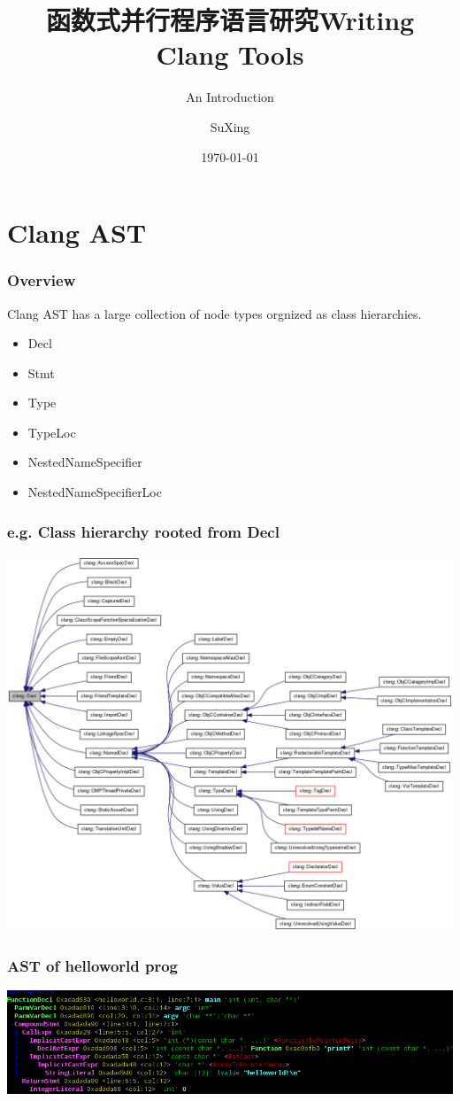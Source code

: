 \documentclass[]{beamer}
\title{函数式并行程序语言研究}
\title{Writing Clang Tools}
\subtitle{An Introduction}
\author[SuXing~pysuxing@gmail.com]{SuXing}
\institute{TOW}
\date{\today}
\begin{document}
\setlength{\parindent}{0pt}

\frame{\titlepage}

\frame{\tableofcontents}

\section{Clang AST}
\frame{\tableofcontents[currentsection]}
\begin{frame}
  \frametitle{Overview}
  Clang AST has a large collection of node types orgnized as class hierarchies.
  \begin{itemize}
    \item Decl
    \item Stmt
    \item Type
    \item TypeLoc
    \item NestedNameSpecifier
    \item NestedNameSpecifierLoc
  \end{itemize}
\end{frame}

\begin{frame}
  \frametitle{e.g. Class hierarchy rooted from Decl}
  \includegraphics[height=.8\textheight]{figures/decl-hierarchy}
\end{frame}

\begin{frame}
  \frametitle{AST of helloworld prog}
  
  \centerline{\includegraphics[width=\textwidth]{figures/helloworld}}
\end{frame}
\end{document}
